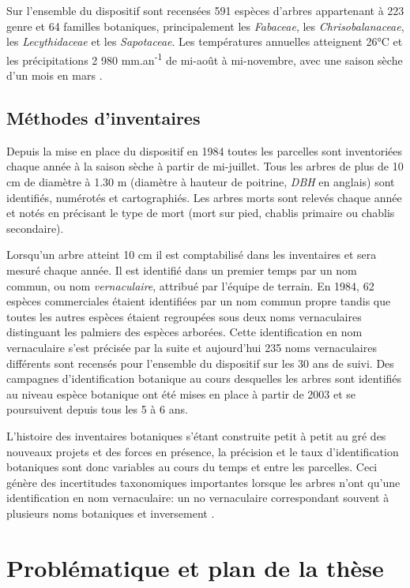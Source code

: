 \documentclass[
  11pt,
  french,
  A4paper,
  extrafontsizes,onecolumn,openright
  ]{memoir}
\begin{document}
Sur l'ensemble du dispositif sont recensées 591 espèces d'arbres
appartenant à 223 genre et 64 familles botaniques, principalement les
\emph{Fabaceae}, les \emph{Chrisobalanaceae}, les \emph{Lecythidaceae}
et les \emph{Sapotaceae}. Les températures annuelles atteignent 26°C et
les précipitations 2 980 mm.an\textsuperscript{-1} de mi-août à
mi-novembre, avec une saison sèche d'un mois en mars
\autocite{Wagner2011}.

\subsection{Méthodes d'inventaires}\label{methodes-dinventaires}

Depuis la mise en place du dispositif en 1984 toutes les parcelles sont
inventoriées chaque année à la saison sèche à partir de mi-juillet. Tous
les arbres de plus de 10 cm de diamètre à 1.30 m (diamètre à hauteur de
poitrine, \emph{DBH} en anglais) sont identifiés, numérotés et
cartographiés. Les arbres morts sont relevés chaque année et notés en
précisant le type de mort (mort sur pied, chablis primaire ou chablis
secondaire).

Lorsqu'un arbre atteint 10 cm il est comptabilisé dans les inventaires
et sera mesuré chaque année. Il est identifié dans un premier temps par
un nom commun, ou nom \emph{vernaculaire}, attribué par l'équipe de
terrain. En 1984, 62 espèces commerciales étaient identifiées par un nom
commun propre tandis que toutes les autres espèces étaient regroupées
sous deux noms vernaculaires distinguant les palmiers des espèces
arborées. Cette identification en nom vernaculaire s'est précisée par la
suite et aujourd'hui 235 noms vernaculaires différents sont recensés
pour l'ensemble du dispositif sur les 30 ans de suivi. Des campagnes
d'identification botanique au cours desquelles les arbres sont
identifiés au niveau espèce botanique ont été mises en place à partir de
2003 et se poursuivent depuis tous les 5 à 6 ans.

L'histoire des inventaires botaniques s'étant construite petit à petit
au gré des nouveaux projets et des forces en présence, la précision et
le taux d'identification botaniques sont donc variables au cours du
temps et entre les parcelles. Ceci génère des incertitudes taxonomiques
importantes lorsque les arbres n'ont qu'une identification en nom
vernaculaire: un no vernaculaire correspondant souvent à plusieurs noms
botaniques et inversement \autocite{Oldeman1968}.

\section{Problématique et plan de la
thèse}\label{problematique-et-plan-de-la-these}
\end{document}
